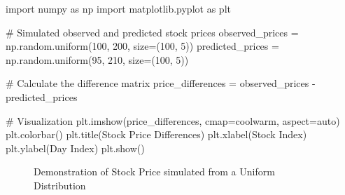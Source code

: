 \documentclass[
  letterpaper,
  DIV=11,
  numbers=noendperiod]{scrreprt}
\newenvironment{Shaded}{\begin{snugshade}}{\end{snugshade}}
\newcommand{\CommentTok}[1]{\textcolor[rgb]{0.37,0.37,0.37}{#1}}
\newcommand{\DecValTok}[1]{\textcolor[rgb]{0.68,0.00,0.00}{#1}}
\newcommand{\ImportTok}[1]{\textcolor[rgb]{0.00,0.46,0.62}{#1}}
\newcommand{\NormalTok}[1]{\textcolor[rgb]{0.00,0.23,0.31}{#1}}
\newcommand{\OperatorTok}[1]{\textcolor[rgb]{0.37,0.37,0.37}{#1}}
\newcommand{\StringTok}[1]{\textcolor[rgb]{0.13,0.47,0.30}{#1}}
\theoremstyle{plain}
\theoremstyle{definition}
\theoremstyle{remark}
\begin{document}
\begin{Shaded}
\begin{Highlighting}[]
\ImportTok{import}\NormalTok{ numpy }\ImportTok{as}\NormalTok{ np}
\ImportTok{import}\NormalTok{ matplotlib.pyplot }\ImportTok{as}\NormalTok{ plt}

\CommentTok{\# Simulated observed and predicted stock prices}
\NormalTok{observed\_prices }\OperatorTok{=}\NormalTok{ np.random.uniform(}\DecValTok{100}\NormalTok{, }\DecValTok{200}\NormalTok{, size}\OperatorTok{=}\NormalTok{(}\DecValTok{100}\NormalTok{, }\DecValTok{5}\NormalTok{))}
\NormalTok{predicted\_prices }\OperatorTok{=}\NormalTok{ np.random.uniform(}\DecValTok{95}\NormalTok{, }\DecValTok{210}\NormalTok{, size}\OperatorTok{=}\NormalTok{(}\DecValTok{100}\NormalTok{, }\DecValTok{5}\NormalTok{))}

\CommentTok{\# Calculate the difference matrix}
\NormalTok{price\_differences }\OperatorTok{=}\NormalTok{ observed\_prices }\OperatorTok{{-}}\NormalTok{ predicted\_prices}

\CommentTok{\# Visualization}
\NormalTok{plt.imshow(price\_differences, cmap}\OperatorTok{=}\StringTok{\textquotesingle{}coolwarm\textquotesingle{}}\NormalTok{, aspect}\OperatorTok{=}\StringTok{\textquotesingle{}auto\textquotesingle{}}\NormalTok{)}
\NormalTok{plt.colorbar()}
\NormalTok{plt.title(}\StringTok{\textquotesingle{}Stock Price Differences\textquotesingle{}}\NormalTok{)}
\NormalTok{plt.xlabel(}\StringTok{\textquotesingle{}Stock Index\textquotesingle{}}\NormalTok{)}
\NormalTok{plt.ylabel(}\StringTok{\textquotesingle{}Day Index\textquotesingle{}}\NormalTok{)}
\NormalTok{plt.show()}
\end{Highlighting}
\end{Shaded}

\begin{figure}[H]


\caption{\label{fig-sim}Demonstration of Stock Price simulated from a
Uniform Distribution}

\end{figure}%
\end{document}
